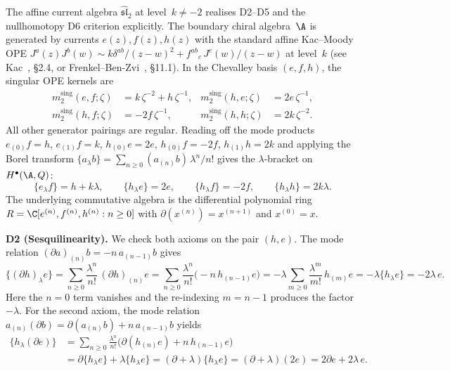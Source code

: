 \begin{example}
\label{comp:pva-descent-affine-sl2}
The affine current algebra
$\widehat{\mathfrak{sl}}_2$ at level~$k\neq-2$ realises D2--D5 and the nullhomotopy D6 criterion explicitly.
The boundary chiral algebra~$\A$ is generated by currents
$e(z),f(z),h(z)$ with the standard affine Kac--Moody OPE
$J^a(z)J^b(w) \sim k\delta^{ab}/(z{-}w)^2 + f^{ab}{}_c\,J^c(w)/(z{-}w)$
at level~$k$ (see Kac~\cite{Kac98}, \S2.4, or
Frenkel--Ben-Zvi~\cite{FBZ04}, \S11.1).
In the Chevalley basis $(e,f,h)$, the singular OPE kernels are
\begin{align*}
m_2^{\mathrm{sing}}(e,f;\zeta)
 &= k\,\zeta^{-2}+h\,\zeta^{-1},
&
m_2^{\mathrm{sing}}(h,e;\zeta)
 &= 2e\,\zeta^{-1},
\\
m_2^{\mathrm{sing}}(h,f;\zeta)
 &= -2f\,\zeta^{-1},
&
m_2^{\mathrm{sing}}(h,h;\zeta)
 &= 2k\,\zeta^{-2}.
\end{align*}
All other generator pairings are regular.
Reading off the mode products
$e_{(0)}f=h$, $e_{(1)}f=k$, $h_{(0)}e=2e$, $h_{(0)}f=-2f$,
$h_{(1)}h=2k$
and applying the Borel transform
$\{a_\lambda b\}=\sum_{n\ge0}(a_{(n)}b)\,\lambda^n/n!$
gives the $\lambda$-bracket on $H^\bullet(\A,Q)$:
\begin{equation}
\label{eq:sl2-lambda-brackets}
\{e_\lambda f\}=h+k\lambda,
\qquad
\{h_\lambda e\}=2e,
\qquad
\{h_\lambda f\}=-2f,
\qquad
\{h_\lambda h\}=2k\lambda.
\end{equation}
The underlying commutative algebra is the differential polynomial ring
$R=\C[e^{(n)},f^{(n)},h^{(n)}:n\ge0]$
with $\partial(x^{(n)})=x^{(n+1)}$ and $x^{(0)}=x$.

\smallskip
\noindent\textbf{D2 (Sesquilinearity).}
We check both axioms on the pair $(h,e)$.
The mode relation $(\partial a)_{(n)} b=-n\,a_{(n-1)}b$ gives
\[
\{(\partial h)_\lambda e\}
=
\sum_{n\ge0}\frac{\lambda^n}{n!}\,(\partial h)_{(n)}e
=
\sum_{n\ge0}\frac{\lambda^n}{n!}\bigl(-n\,h_{(n-1)}e\bigr)
=
-\lambda\sum_{m\ge0}\frac{\lambda^m}{m!}\,h_{(m)}e
=
-\lambda\{h_\lambda e\}
=
-2\lambda\,e.
\]
Here the $n=0$ term vanishes and the re-indexing $m=n-1$ produces the
factor $-\lambda$. For the second axiom, the mode relation
$a_{(n)}(\partial b)=\partial(a_{(n)}b)+n\,a_{(n-1)}b$ yields
\begin{align*}
\{h_\lambda(\partial e)\}
&=
\sum_{n\ge0}\frac{\lambda^n}{n!}\bigl(\partial(h_{(n)}e)+n\,h_{(n-1)}e\bigr)
\\
&=
\partial\{h_\lambda e\}+\lambda\{h_\lambda e\}
=
(\partial+\lambda)\{h_\lambda e\}
=
(\partial+\lambda)(2e)
=
2\partial e+2\lambda\,e.
\end{align*}


\end{example}
